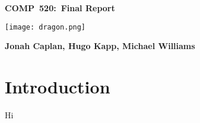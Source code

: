 \documentclass[11pt]{article}
\newcommand{\hmwkTitle}{Final Report} %
\newcommand{\hmwkClass}{COMP\ 520} %
\newcommand{\hmwkAuthorName}{Jonah Caplan, Hugo Kapp, Michael Williams} %
\begin{document}
\begin{titlepage}
\centering
\vspace{2in}
\textmd{\textbf{\LARGE \hmwkClass:\ \hmwkTitle}}\\
\vspace{1in}

\texttt{[image: dragon.png]}

\textbf{\hmwkAuthorName}


\end{titlepage}
\tableofcontents\label{toc}
\newpage
{}
\setcounter{page}{1}
\section{Introduction}
Hi
\end{document}
